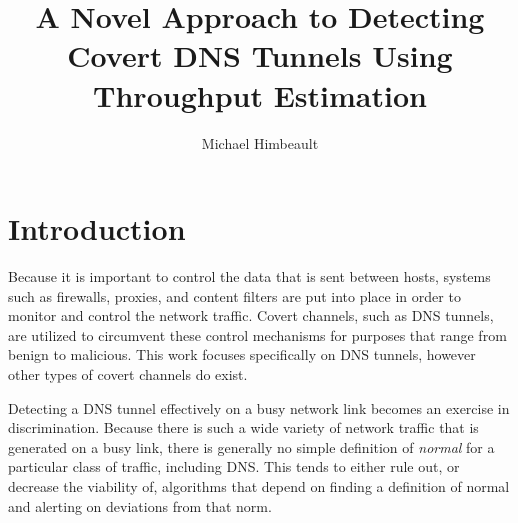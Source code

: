 \documentclass{article}
\theoremstyle{remark}
\theoremstyle{definition}
\theoremstyle{definition}
\theoremstyle{definition}
\begin{document}

\title{A Novel Approach to Detecting Covert DNS Tunnels Using Throughput
Estimation}
\author{Michael Himbeault}

\maketitle


\tableofcontents

\newpage


\section{Introduction}

Because it is important to control the data that is sent between hosts, systems
such as firewalls, proxies, and content filters are put into place in order to
monitor and control the network traffic. Covert channels, such as DNS tunnels,
are utilized to circumvent these control mechanisms for purposes that range from
benign to malicious. This work focuses specifically on DNS tunnels, however
other types of covert channels do exist.

Detecting a DNS tunnel effectively on a busy network link becomes an exercise
in discrimination. Because there is such a wide variety of network traffic that
is generated on a busy link, there is generally no simple definition of
\emph{normal} for a particular class of traffic, including DNS. This tends to
either rule out, or decrease the viability of, algorithms that depend on
finding a definition of normal and alerting on deviations from that norm.
\end{document}
